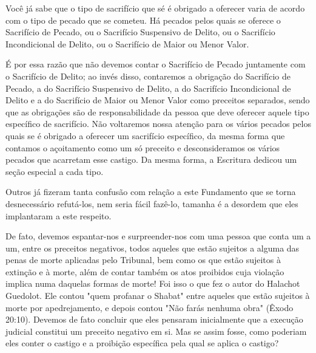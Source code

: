 Você já sabe que o tipo de sacrifício que sé é obrigado a oferecer varia
de acordo com o tipo de pecado que se cometeu. Há pecados pelos quais se
oferece o Sacrifício de Pecado, ou o Sacrifício Suspensivo de Delito, ou
o Sacrifício Incondicional de Delito, ou o Sacrifício de Maior ou Menor
Valor.

É por essa razão que não devemos contar o Sacrifício de Pecado
juntamente com o Sacrifício de Delito; ao invés disso, contaremos a
obrigação do Sacrifí­cio de Pecado, a do Sacrifício Suspensivo de
Delito, a do Sacrifício Incondicio­nal de Delito e a do Sacrifício de
Maior ou Menor Valor como preceitos separa­dos, sendo que as obrigações
são de responsabilidade da pessoa que deve ofe­recer aquele tipo
específico de sacrifício. Não voltaremos nossa atenção para os vários
pecados pelos quais se é obrigado a oferecer um sacrifício específico,
da mesma forma que contamos o açoitamento como um só preceito e
descon­sideramos os vários pecados que acarretam esse castigo. Da mesma
forma, a Escritura dedicou um seção especial a cada tipo.

Outros já fizeram tanta confusão com relação a este Fundamento que se
torna desnecessário refutá-los, nem seria fácil fazê-lo, tamanha é a
desordem que eles implantaram a este respeito.

De fato, devemos espantar-nos e surpreender-nos com uma pessoa que conta
um a um, entre os preceitos negativos, todos aqueles que estão sujei­tos
a alguma das penas de morte aplicadas pelo Tribunal, bem como os que
estão sujeitos à extinção e à morte, além de contar também os atos
proibidos cuja violação implica numa daquelas formas de morte! Foi isso
o que fez o au­tor do Halachot Guedolot. Ele contou "quem profanar o
Shabat" entre aqueles que estão sujeitos à morte por apedrejamento, e
depois contou "Não farás ne­nhuma obra" (Êxodo 20:10). Devemos de fato
concluir que eles pensaram ini­cialmente que a execução judicial
constitui um preceito negativo em si. Mas se assim fosse, como poderiam
eles conter o castigo e a proibição específica pela qual se aplica o
castigo?

